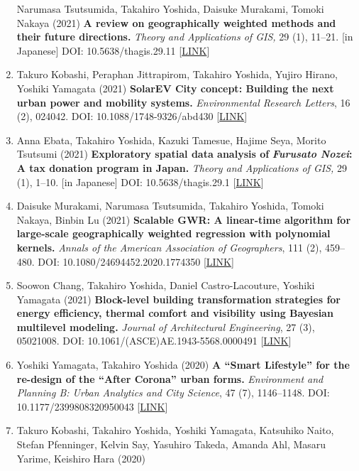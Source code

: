 \documentclass[
]{book}
\begin{document}
\begin{enumerate}
  Narumasa Tsutsumida, Takahiro Yoshida, Daisuke Murakami, Tomoki Nakaya (2021)
  \textbf{A review on geographically weighted methods and their future directions.}
  \emph{Theory and Applications of GIS,} 29 (1), 11--21. {[}in Japanese{]}
  DOI: 10.5638/thagis.29.11 {[}\href{https://www.jstage.jst.go.jp/article/thagis/29/1/29_11/_article/-char/en}{LINK}{]}
\item
  Takuro Kobashi, Peraphan Jittrapirom, Takahiro Yoshida, Yujiro Hirano, Yoshiki Yamagata (2021)
  \textbf{SolarEV City concept: Building the next urban power and mobility systems.}
  \emph{Environmental Research Letters}, 16 (2), 024042.
  DOI: 10.1088/1748-9326/abd430 {[}\href{https://doi.org/10.1088/1748-9326/abd430}{LINK}{]}
\item
  Anna Ebata, Takahiro Yoshida, Kazuki Tamesue, Hajime Seya, Morito Tsutsumi (2021)
  \textbf{Exploratory spatial data analysis of} \textbf{\emph{Furusato Nozei}: A tax donation program in Japan.}
  \emph{Theory and Applications of GIS,} 29 (1), 1--10. {[}in Japanese{]}
  DOI: 10.5638/thagis.29.1 {[}\href{https://www.jstage.jst.go.jp/article/thagis/29/1/29_1/_article/-char/en}{LINK}{]}
\item
  Daisuke Murakami, Narumasa Tsutsumida, Takahiro Yoshida, Tomoki Nakaya, Binbin Lu (2021)
  \textbf{Scalable GWR: A linear-time algorithm for large-scale geographically weighted regression with polynomial kernels.}
  \emph{Annals of the American Association of Geographers}, 111 (2), 459--480.
  DOI: 10.1080/24694452.2020.1774350 {[}\href{https://www.tandfonline.com/doi/full/10.1080/24694452.2020.1774350}{LINK}{]}
\item
  Soowon Chang, Takahiro Yoshida, Daniel Castro-Lacouture, Yoshiki Yamagata (2021) \textbf{Block-level building transformation strategies for energy efficiency, thermal comfort and visibility using Bayesian multilevel modeling.}
  \emph{Journal of Architectural Engineering}, 27 (3), 05021008.
  DOI: 10.1061/(ASCE)AE.1943-5568.0000491 {[}\href{https://ascelibrary.org/doi/abs/10.1061/\%28ASCE\%29AE.1943-5568.0000491}{LINK}{]}
\item
  Yoshiki Yamagata, Takahiro Yoshida (2020)
  \textbf{A ``Smart Lifestyle'' for the re-design of the ``After Corona'' urban forms.}
  \emph{Environment and Planning B: Urban Analytics and City Science}, 47 (7), 1146--1148.
  DOI: 10.1177/2399808320950043 {[}\href{http://dx.doi.org/10.1177/2399808320950043}{LINK}{]}
\item
  Takuro Kobashi, Takahiro Yoshida, Yoshiki Yamagata, Katsuhiko Naito, Stefan Pfenninger, Kelvin Say, Yasuhiro Takeda, Amanda Ahl, Masaru Yarime, Keishiro Hara (2020)

\end{enumerate}
\end{document}
